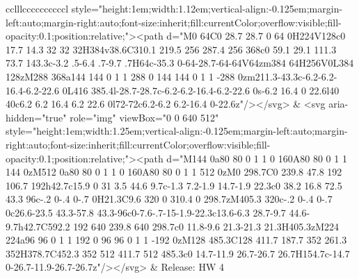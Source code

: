 \documentclass[
]{article}
\begin{document}
\begin{figure*}
\begin{longtable*}{cclllccccccccccl}
style="height:1em;width:1.12em;vertical-align:-0.125em;margin-left:auto;margin-right:auto;font-size:inherit;fill:currentColor;overflow:visible;fill-opacity:0.1;position:relative;"><path d="M0 64C0 28.7 28.7 0 64 0H224V128c0 17.7 14.3 32 32 32H384v38.6C310.1 219.5 256 287.4 256 368c0 59.1 29.1 111.3 73.7 143.3c-3.2 .5-6.4 .7-9.7 .7H64c-35.3 0-64-28.7-64-64V64zm384 64H256V0L384 128zM288 368a144 144 0 1 1 288 0 144 144 0 1 1 -288 0zm211.3-43.3c-6.2-6.2-16.4-6.2-22.6 0L416 385.4l-28.7-28.7c-6.2-6.2-16.4-6.2-22.6 0s-6.2 16.4 0 22.6l40 40c6.2 6.2 16.4 6.2 22.6 0l72-72c6.2-6.2 6.2-16.4 0-22.6z"/></svg> & <svg aria-hidden="true" role="img" viewBox="0 0 640 512" style="height:1em;width:1.25em;vertical-align:-0.125em;margin-left:auto;margin-right:auto;font-size:inherit;fill:currentColor;overflow:visible;fill-opacity:0.1;position:relative;"><path d="M144 0a80 80 0 1 1 0 160A80 80 0 1 1 144 0zM512 0a80 80 0 1 1 0 160A80 80 0 1 1 512 0zM0 298.7C0 239.8 47.8 192 106.7 192h42.7c15.9 0 31 3.5 44.6 9.7c-1.3 7.2-1.9 14.7-1.9 22.3c0 38.2 16.8 72.5 43.3 96c-.2 0-.4 0-.7 0H21.3C9.6 320 0 310.4 0 298.7zM405.3 320c-.2 0-.4 0-.7 0c26.6-23.5 43.3-57.8 43.3-96c0-7.6-.7-15-1.9-22.3c13.6-6.3 28.7-9.7 44.6-9.7h42.7C592.2 192 640 239.8 640 298.7c0 11.8-9.6 21.3-21.3 21.3H405.3zM224 224a96 96 0 1 1 192 0 96 96 0 1 1 -192 0zM128 485.3C128 411.7 187.7 352 261.3 352H378.7C452.3 352 512 411.7 512 485.3c0 14.7-11.9 26.7-26.7 26.7H154.7c-14.7 0-26.7-11.9-26.7-26.7z"/></svg> & Release: HW 4 \\ 

\end{longtable*}
\end{figure*}
\end{document}
